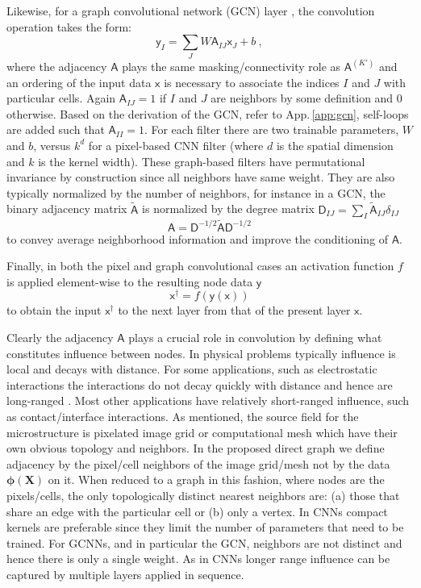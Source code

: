 \documentclass[12pt,reqno]{article}
\newcommand{\aref}[1]{App.\,\ref{#1}}
\newcommand{\Xb}{\mathbf{X}}
\newcommand{\As}{\mathsf{A}}
\newcommand{\Ds}{\mathsf{D}}
\newcommand{\xs}{\mathsf{x}}
\newcommand{\ys}{\mathsf{y}}
\newcommand{\phib}{{\boldsymbol{\phi}}}
\begin{document}
Likewise, for a graph convolutional network (GCN) layer \cite{kipf2016semi}, the convolution operation takes the form:
\begin{equation}
\ys_I = \sum_J W \As_{IJ} \xs_J + b \ ,
\end{equation}
where the adjacency $\As$ plays the same masking/connectivity role as $\As^{(K')}$ and an ordering of the input data $\xs$ is necessary to associate the indices $I$ and $J$ with particular cells.
Again $\As_{IJ} = 1$ if $I$ and $J$ are neighbors by some definition and 0 otherwise.
Based on the derivation of the GCN, refer to \aref{app:gcn}, self-loops are added such that $\As_{II} = 1$.
For each filter there are two trainable parameters, $W$ and $b$, versus $k^d$ for a pixel-based CNN filter (where $d$ is the spatial dimension and $k$ is the kernel width).
These graph-based filters have permutational invariance by construction since all neighbors have same weight.
They are also typically normalized by the number of neighbors, for instance in a GCN, the binary adjacency matrix $\tilde{\As}$
is normalized by the degree matrix $\Ds_{IJ} = \sum_I \tilde{\As}_{IJ} \delta_{IJ}$
\begin{equation}
{\As} = \Ds^{-1/2} \tilde{\As} \Ds^{-1/2}
\end{equation}
to convey average neighborhood information and improve the conditioning of $\As$.

Finally, in both the pixel and graph convolutional cases an activation function $f$ is applied element-wise to the resulting node data $\ys$
\begin{equation}
\xs^\dag = f\left(\ys(\xs)\right)
\end{equation}
to obtain the input $\xs^\dag$ to the next layer from that of the present layer $\xs$.

Clearly the adjacency $\As$ plays a crucial role in convolution by defining what constitutes influence between nodes.
In physical problems typically influence is local and decays with distance.
For some applications, such as electrostatic interactions the interactions do not decay quickly with distance and hence are long-ranged \cite{li2020multipole}.
Most other applications have relatively short-ranged influence, such as contact/interface interactions.
As mentioned, the source field for the microstructure is pixelated image grid or computational mesh which have their own obvious topology and neighbors.
In the proposed direct graph we define adjacency by the pixel/cell neighbors of the image grid/mesh not by the data $\phib(\Xb)$ on it.
When reduced to a graph in this fashion, where nodes are the pixels/cells, the only topologically distinct nearest neighbors are: (a) those that share an edge with the particular cell or (b) only a vertex.
In CNNs compact kernels are preferable since they limit the number of parameters that need to be trained.
For GCNNs, and in particular the GCN, neighbors are not distinct and hence there is only a single weight.
As in CNNs longer range influence can be captured by multiple layers applied in sequence.
\end{document}
